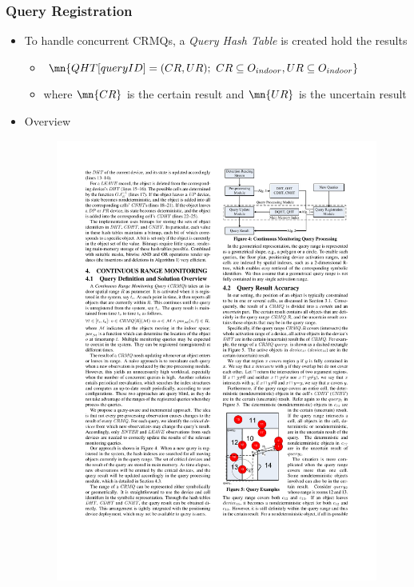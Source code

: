 \begin{frame}
\frametitle{Query Registration}

\begin{itemize}
  \item To handle concurrent \textrm{CRMQ}s, a \emph{Query Hash Table} is created hold the results
    \begin{itemize}
      \item $\mn{QHT[queryID] = (CR, UR);~ CR \subseteq O_{indoor}, UR \subseteq O_{indoor}}$
      \item where $\mn{CR}$ is the certain result and $\mn{UR}$ is the uncertain result
    \end{itemize}
  \item Overview
    \begin{figure}[tb]
      \includegraphics[width=0.68\columnwidth]{figures/2-2/2-2-6.pdf}
    \end{figure}
\end{itemize}

\end{frame}


